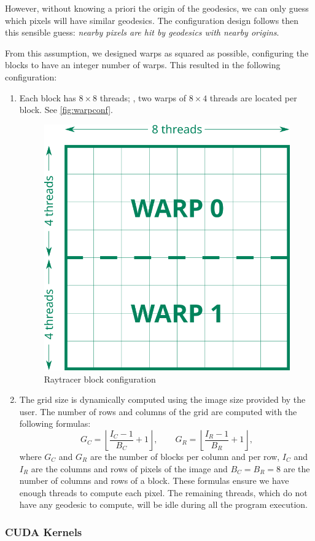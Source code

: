 However, without knowing a priori the origin of the geodesics, we can only guess which pixels will have similar geodesics. The configuration design follows then this sensible guess: \emph{nearby pixels are hit by geodesics with nearby origins}.

From this assumption, we designed warps as squared as possible, configuring the blocks to have an integer number of warps. This resulted in the following configuration:
\begin{enumerate}
	\item Each block has $8\times8$ threads; \ie, two warps of $8\times4$ threads are located per block. See \autoref{fig:warpconf}.
	\begin{figure}[bth]
		\myfloatalign
		\includegraphics[width=.3\linewidth]{gfx/warpconf.png}
		\caption[Raytracer block configuration]{Raytracer block configuration}
		\label{fig:warpconf}
	\end{figure}
	\item The grid size is dynamically computed using the image size provided by the user. The number of rows and columns of the grid are computed with the following formulas:
	\begin{equation*}
	G_C = \left \lfloor{\frac{I_C - 1}{B_C} + 1}\right \rfloor, \qquad
	G_R = \left \lfloor{\frac{I_R - 1}{B_R} + 1}\right \rfloor,
	\end{equation*}
	where $G_C$ and $G_R$ are the number of blocks per column and per row, $I_C$ and $I_R$ are the columns and rows of pixels of the image and $B_C = B_R = 8$ are the number of columns and rows of a block. These formulas ensure we have enough threads to compute each pixel. The remaining threads, which do not have any geodesic to compute, will be idle during all the program execution.
\end{enumerate}

\subsubsection*{CUDA Kernels}


